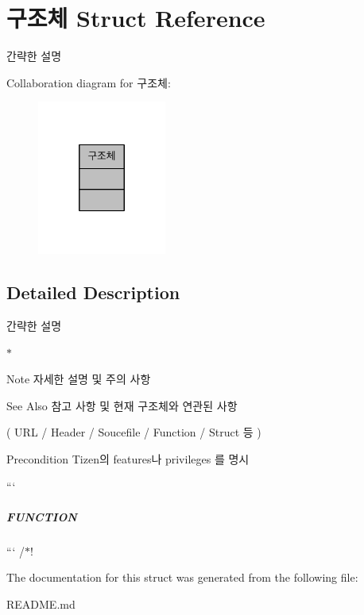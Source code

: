 \hypertarget{struct_xEA_xB5_xAC_xEC_xA1_xB0_xEC_xB2_xB4}{\section{구조체 Struct Reference}
\label{struct_xEA_xB5_xAC_xEC_xA1_xB0_xEC_xB2_xB4}
}


간략한 설명  




Collaboration diagram for 구조체\-:\nopagebreak
\begin{figure}[H]
\begin{center}
\leavevmode
\includegraphics[width=120pt]{d3/de8/struct_xEA_xB5_xAC_xEC_xA1_xB0_xEC_xB2_xB4__coll__graph}
\end{center}
\end{figure}


\subsection{Detailed Description}
간략한 설명 


\begin{DoxyItemize}
\item $\ast$ \begin{DoxyNote}{Note}
자세한 설명 및 주의 사항
\end{DoxyNote}

\item \begin{DoxySeeAlso}{See Also}
참고 사항 및 현재 구조체와 연관된 사항
\end{DoxySeeAlso}

\item ( U\-R\-L / Header / Soucefile / Function / Struct 등 )
\item \begin{DoxyPrecond}{Precondition}
Tizen의 features나 privileges 를 명시
\end{DoxyPrecond}
```
\end{DoxyItemize}

\subparagraph*{F\-U\-N\-C\-T\-I\-O\-N}

``` /$\ast$! 

The documentation for this struct was generated from the following file\-:\begin{DoxyCompactItemize}
\item 
R\-E\-A\-D\-M\-E.\-md\end{DoxyCompactItemize}
